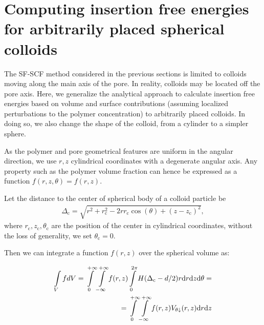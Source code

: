 \documentclass[10pt, a4paper, twocolumn]{article}
\begin{document}



\section{Computing insertion free energies for arbitrarily placed spherical colloids}


The SF-SCF method considered in the previous sections is limited to colloids moving along the main axis of the pore.
In reality, colloids may be located off the pore axis.
Here, we generalize the analytical approach to calculate insertion free energies based on volume and surface contributions (assuming localized perturbations to the polymer concentration) to arbitrarily placed colloids.
In doing so, we also change the shape of the colloid, from a cylinder to a simpler sphere.

As the polymer and pore geometrical features are uniform in the angular direction, we use $r, z$ cylindrical coordinates with a degenerate angular axis.
Any property such as the polymer volume fraction can hence be expressed as a function $f(r,z,\theta) = f(r,z)$.

Let the distance to the center of spherical body of a colloid particle be 
\begin{eqnarray}
\Delta_{\text{c}} = \sqrt{r^2 + r_{\text{c}}^2 - 2 r r_{\text{c}} \cos(\theta) + (z - z_{\text{c}})^2},
\end{eqnarray} 
where $r_{\text{c}}, z_{\text{c}}, \theta_{\text{c}}$ are the position of the center in cylindrical coordinates, without the loss of generality, we set $\theta_{\text{c}} = 0$.

Then we can integrate a function $f(r,z)$ over the spherical volume as:

\begin{eqnarray}
    \label{eq:int_indicator_V}
    \begin{aligned}
        \int\limits_{V} f dV
        =\int\displaylimits_{0}^{+\infty} \int\displaylimits_{-\infty}^{+\infty} f(r, z) \int\displaylimits_{0}^{2\pi}  H(\Delta_{\text{c}} - d/2) r \text{d}r \text{d}z \text{d}\theta =\\
        =\int\displaylimits_{0}^{+\infty} \int\displaylimits_{-\infty}^{+\infty} f(r, z)  V_{\theta \downarrow}(r,z) \text{d}r \text{d}z
    \end{aligned}
\end{eqnarray}
\end{document}
